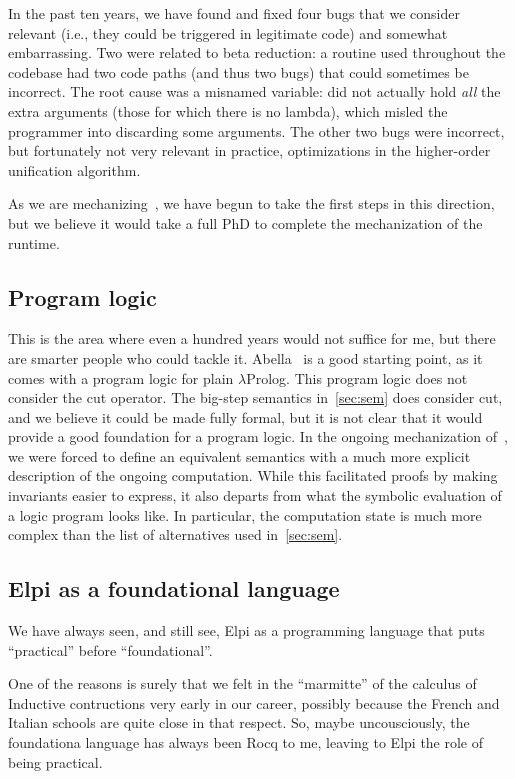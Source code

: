 \documentclass[a4paper, 11pt]{book}
\begin{document}
In the past ten years, we have found and fixed four bugs that we consider
relevant (i.e., they could be triggered in legitimate code) and somewhat
embarrassing. Two were related to beta reduction: a routine used throughout the
codebase had two code paths (and thus two bugs) that could sometimes be
incorrect. The root cause was a misnamed variable:  did not
actually hold \emph{all} the extra arguments (those for which there is no
lambda), which misled the programmer into discarding some arguments. The other
two bugs were incorrect, but fortunately not very relevant in practice,
optimizations in the higher-order unification algorithm.

As we are mechanizing~\cite{elpidet}, we have begun to take the first steps in
this direction, but we believe it would take a full PhD to complete the
mechanization of the runtime.

\subsection{Program logic}

This is the area where even a hundred years would not suffice for me, but there
are smarter people who could tackle it. Abella~\cite{abella} is a good starting
point, as it comes with a program logic for plain $\lambda$Prolog. This program
logic does not consider the cut operator. The big-step semantics
in~\cref{sec:sem} does consider cut, and we believe it could be made fully
formal, but it is not clear that it would provide a good foundation for a
program logic. In the ongoing mechanization of~\cite{elpidet}, we were forced
to define an equivalent semantics with a much more explicit description of the
ongoing computation. While this facilitated proofs by making invariants easier
to express, it also departs from what the symbolic evaluation of a logic
program looks like. In particular, the computation state is much more complex
than the list of alternatives used in~\cref{sec:sem}.

\subsection{Elpi as a foundational language}

We have always seen, and still see, Elpi as a programming language
that puts ``practical'' before ``foundational''.

One of the reasons is surely
that we felt in the ``marmitte'' of the calculus of
Inductive contructions very early in our career, possibly because
the French and Italian schools are quite close in that respect.
So, maybe uncousciously, the foundationa language has always
been Rocq to me, leaving to Elpi the role of being practical.
\end{document}
